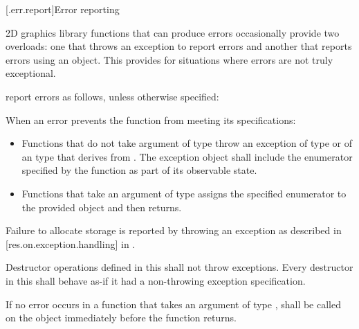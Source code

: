 [\iotwod.err.report]{Error reporting}

\pnum
2D graphics library functions that can produce errors occasionally provide two overloads: one that throws an exception to report errors and another that reports errors using an  object. This provides for situations where errors are not truly exceptional.

\pnum
report errors as follows, unless otherwise specified:

\pnum
When an error prevents the function from meeting its specifications:

\begin{itemize}
\item Functions that do not take argument of type  throw an exception of type  or of an  type that derives from . The exception object shall include the enumerator specified by the function as part of its observable state.

\item Functions that take an argument of type  assigns the specified enumerator to the provided  object and then returns.
\end{itemize}

\pnum
Failure to allocate storage is reported by throwing an exception as described in [res.on.exception.handling] in \CppXVII.

\pnum
Destructor operations defined in this \documenttypename{} shall not throw exceptions. Every destructor in this \documenttypename{} shall behave as-if it had a non-throwing exception specification.

\pnum
If no error occurs in a function that takes an argument of type ,  shall be called on the  object immediately before the function returns.

